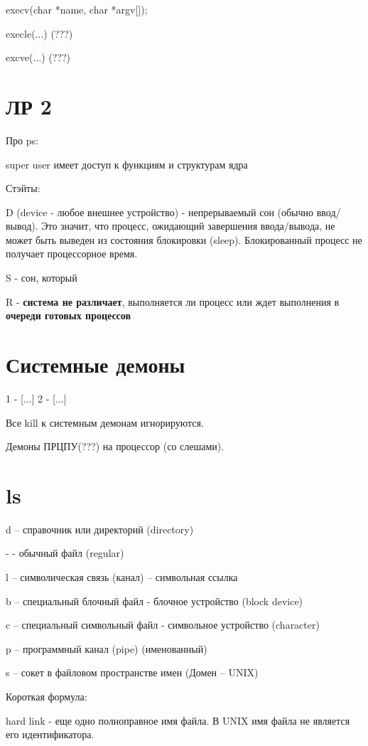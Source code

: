 \documentclass[14pt, a4paper]{article}
\begin{document}
	execv(char *name, char *argv[]);
	
	execle(...) (???)
	
	excve(...) (???)
	
	\section{ЛР 2}
	
	Про ps:
	
	super user имеет доступ к функциям и структурам ядра
	
	Стэйты:
	
	D (device - любое внешнее устройство) - непрерываемый сон (обычно ввод/вывод). Это значит, что процесс, ожидающий завершения ввода/вывода, не может быть выведен из состояния блокировки (sleep). Блокированный процесс не получает процессорное время.
	
	S - сон, который
	
	R - {\bf система не различает}, выполняется ли процесс или ждет выполнения в {\bf очереди готовых процессов}
	
	\section{Системные демоны}
	
	1 - [...]
	2 - [...]
	
	Все kill к системным демонам игнорируются.
	
	Демоны ПРЦПУ(???) на процессор (со слешами).
	
	\section{ls}
	
	d – справочник или директорий (directory)
	
	-  - обычный файл (regular)
	
	l – символическая связь (канал) – символьная ссылка
	
	b – специальный блочный файл - блочное устройство (block device)
	
	c – специальный символьный файл - символьное устройство (character)
	
	p – программный канал (pipe) (именованный)
	
	s – сокет в файловом пространстве имен (Домен – UNIX)
	
	Короткая формула:
	
	hard link - еще одно полноправное имя файла. В UNIX имя файла не является его идентификатора.
	
\end{document}
